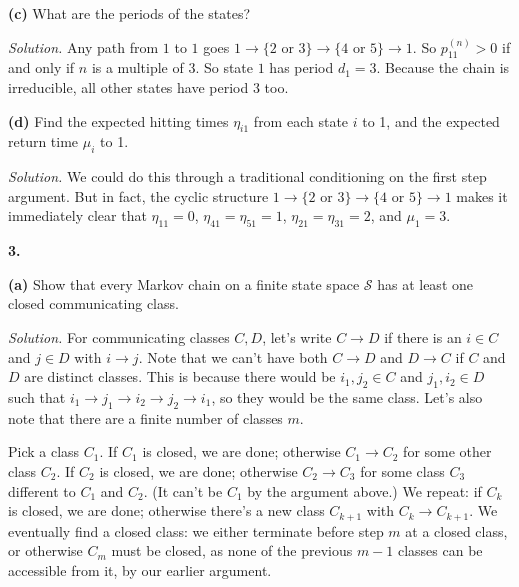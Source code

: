 \documentclass[
  a4paper,
]{article}
\theoremstyle{definition}
\theoremstyle{definition}
\theoremstyle{definition}
\theoremstyle{remark}
\begin{document}
\textbf{(c)} What are the periods of the states?

\begin{myanswers}

\emph{Solution.} Any path from \(1\) to \(1\) goes \(1 \to \{2 \text{ or }3\} \to \{4 \text{ or }5\} \to 1\). So \(p_{11}^{(n)} > 0\) if and only if \(n\) is a multiple of \(3\). So state \(1\) has period \(d_1 = 3\). Because the chain is irreducible, all other states have period \(3\) too.

\end{myanswers}

\textbf{(d)} Find the expected hitting times \(\eta_{i1}\) from each state \(i\) to 1, and the expected return time \(\mu_i\) to 1.

\begin{myanswers}

\emph{Solution.} We could do this through a traditional conditioning on the first step argument. But in fact, the cyclic structure \(1 \to \{2 \text{ or }3\} \to \{4 \text{ or }5\} \to 1\) makes it immediately clear that \(\eta_11 = 0\), \(\eta_{41}=\eta_{51} = 1\), \(\eta_{21} = \eta_{31} = 2\), and \(\mu_1 = 3\).

\end{myanswers}

\textbf{3.}

\textbf{(a)} Show that every Markov chain on a finite state space \(\mathcal S\) has at least one closed communicating class.

\begin{myanswers}

\emph{Solution.} For communicating classes \(C,D\), let's write \(C \to D\) if there is an \(i \in C\) and \(j \in D\) with \(i \to j\). Note that we can't have both \(C \to D\) and \(D \to C\) if \(C\) and \(D\) are distinct classes. This is because there would be \(i_1, j_2 \in C\) and \(j_1, i_2 \in D\) such that \(i_1 \to j_1 \to i_2 \to j_2 \to i_1\), so they would be the same class. Let's also note that there are a finite number of classes \(m\).

Pick a class \(C_1\). If \(C_1\) is closed, we are done; otherwise \(C_1 \to C_2\) for some other class \(C_2\). If \(C_2\) is closed, we are done; otherwise \(C_2 \to C_3\) for some class \(C_3\) different to \(C_1\) and \(C_2\). (It can't be \(C_1\) by the argument above.) We repeat: if \(C_k\) is closed, we are done; otherwise there's a new class \(C_{k+1}\) with \(C_k \to C_{k+1}\). We eventually find a closed class: we either terminate before step \(m\) at a closed class, or otherwise \(C_m\) must be closed, as none of the previous \(m-1\) classes can be accessible from it, by our earlier argument.

\end{myanswers}
\end{document}
